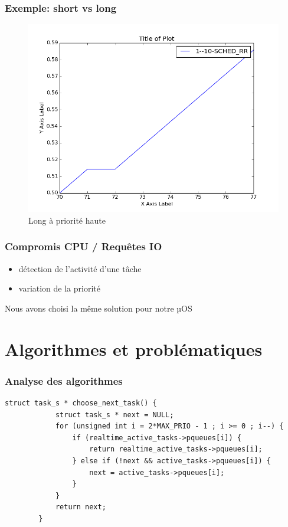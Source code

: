 \documentclass{beamer}
\begin{document}
\begin{frame}
    \frametitle{Exemple: short vs long}

    \begin{center}
        \begin{figure}
            \includegraphics[scale=0.3]{../../short_vs_long/figures/1--10-SCHED_RR}
            \caption{Long à priorité haute}
        \end{figure}
    \end{center}
\end{frame}

\begin{frame}
    \frametitle{Compromis CPU / Requêtes IO}

    \begin{itemize}
        \item détection de l'activité d'une tâche
        \item variation de la priorité
    \end{itemize}

    Nous avons choisi la même solution pour notre µOS
\end{frame}

\section{Algorithmes et problématiques}

\begin{frame}[fragile]
    \frametitle{Analyse des algorithmes}

    \begin{lstlisting}[caption=Choix de la prochaine tâche à exécuter]
        struct task_s * choose_next_task() {
            struct task_s * next = NULL;
            for (unsigned int i = 2*MAX_PRIO - 1 ; i >= 0 ; i--) {
                if (realtime_active_tasks->pqueues[i]) {
                    return realtime_active_tasks->pqueues[i];
                } else if (!next && active_tasks->pqueues[i]) {
                    next = active_tasks->pqueues[i];
                }
            }
            return next;
        }
    \end{lstlisting}
\end{frame}
\end{document}
